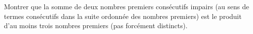 Montrer que la somme de deux nombres premiers consécutifs impairs (au sens de termes consécutifs dans la suite ordonnée des nombres premiers) est le produit d'au moins trois nombres premiers (pas forcément distincts).